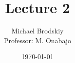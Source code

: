 


\title{Lecture 2}
\date{\today}
\author{Michael Brodskiy\\ \small Professor: M. Onabajo}



\maketitle

